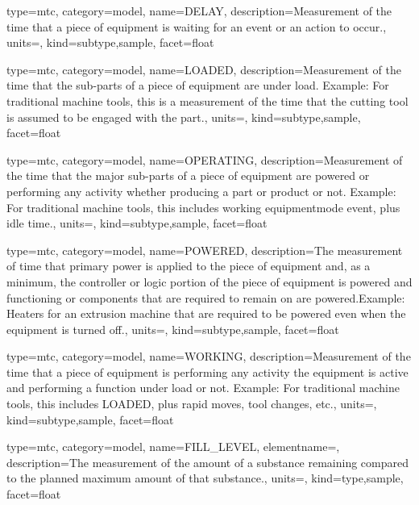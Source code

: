 {
  type=mtc,
  category=model,
  name={DELAY},
  description={Measurement of the time that a piece of equipment is waiting for an event or an action to occur.},
  units=,
  kind={subtype,sample},
  facet={\gls{float}}
}


{
  type=mtc,
  category=model,
  name={LOADED},
  description={Measurement of the time that the sub-parts of a piece of equipment are under load. \newline Example: For traditional machine tools, this is a measurement of the time that the cutting tool is assumed to be engaged with the part.},
  units=,
  kind={subtype,sample},
  facet={\gls{float}}
}


{
  type=mtc,
  category=model,
  name={OPERATING},
  description={Measurement of the time that the major sub-parts of a piece of equipment are powered or performing any activity whether producing a part or product or not.   \newline Example: For traditional machine tools, this includes \gls{working equipmentmode event}, plus idle time.},
  units=,
  kind={subtype,sample},
  facet={\gls{float}}
}


{
  type=mtc,
  category=model,
  name={POWERED},
  description={The measurement of time that primary power is applied to the piece of equipment and, as a minimum, the controller or logic portion of the piece of equipment is powered and functioning or components that are required to remain on are powered.Example: Heaters for an extrusion machine that are required to be powered even when the equipment is turned off.},
  units=,
  kind={subtype,sample},
  facet={\gls{float}}
}


{
  type=mtc,
  category=model,
  name={WORKING},
  description={Measurement of the time that a piece of equipment is performing any activity  the equipment is active and performing a function under load or not. \newline Example: For traditional machine tools, this includes LOADED, plus rapid moves, tool changes, etc.},
  units=,
  kind={subtype,sample},
  facet={\gls{float}}
}


{
  type=mtc,
  category=model,
  name={FILL\_LEVEL},
  elementname=,
  description={The measurement of the amount of a substance remaining compared to the planned maximum amount of that substance.},
  units=,
  kind={type,sample},
  facet={\gls{float}}
}


